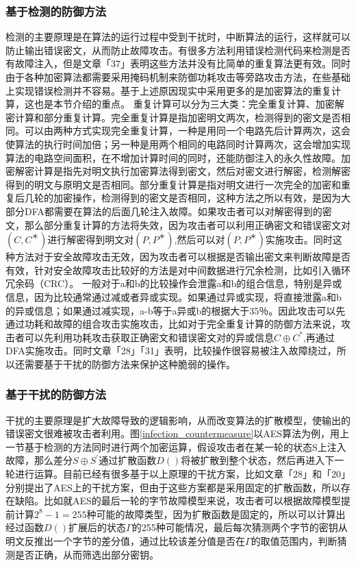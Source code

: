 \documentclass[a4paper,12pt]{article}
\begin{document}
\begin{CJK}{UTF8}{gkai}
\subsubsection{基于检测的防御方法}
检测的主要原理是在算法的运行过程中受到干扰时，中断算法的运行，这样就可以防止输出错误密文，从而防止故障攻击。有很多方法利用错误检测代码来检测是否有故障注入，但是文章「37」表明这些方法并没有比简单的重复算法更有效。同时由于各种加密算法都需要采用掩码机制来防御功耗攻击等旁路攻击方法，在些基础上实现错误检测并不容易。基于上述原因现实中采用更多的是加密算法的重复计算，这也是本节介绍的重点。
重复计算可以分为三大类：完全重复计算、加密解密计算和部分重复计算。完全重复计算是指加密明文两次，检测得到的密文是否相同。可以由两种方式实现完全重复计算，一种是用同一个电路先后计算两次，这会使算法的执行时间加倍；另一种是用两个相同的电路同时计算两次，这会增加实现算法的电路空间面积，在不增加计算时间的同时，还能防御注入的永久性故障。加密解密计算是指先对明文执行加密算法得到密文，然后对密文进行解密，检测解密得到的明文与原明文是否相同。部分重复计算是指对明文进行一次完全的加密和重复后几轮的加密操作，检测得到的密文是否相同，这种方法之所以有效，是因为大部分DFA都需要在算法的后面几轮注入故障。如果攻击者可以对解密得到的密文，那么部分重复计算的方法将失效，因为攻击者可以利用正确密文和错误密文对$(C,C^＊)$进行解密得到明文对$(P,P^＊)$,然后可以对$(P,P^＊)$实施攻击。同时这种方法对于安全故障攻击无效，因为攻击者可以根据是否输出密文来判断故障是否有效，针对安全故障攻击比较好的方法是对中间数据进行冗余检测，比如引入循环冗余码（CRC）。
一般对于a和b的比较操作会泄露a和b的组合信息，特别是异或信息，因为比较通常通过减或者异或实现。如果通过异或实现，将直接泄露a和b的异或信息；如果通过减实现，a-b等于a异或b的根据大于35％。因此攻击可以先通过功耗和故障的组合攻击实施攻击，比如对于完全重复计算的防御方法来说，攻击者可以先利用功耗攻击获取正确密文和错误密文对的异或信息$C \oplus C^*$,再通过DFA实施攻击。同时文章「28」「31」表明，比较操作很容易被注入故障绕过，所以还需要基于干扰的防御方法来保护这种脆弱的操作。

\subsubsection{基于干扰的防御方法}
干扰的主要原理是扩大故障导致的逻辑影响，从而改变算法的扩散模型，使输出的错误密文很难被攻击者利用。图\ref{infection_countermeasure}以AES算法为例，用上一节基于检测的方法同时进行两个加密运算，假设攻击者在某一轮的状态S上注入故障，那么差分$S \oplus S^'$通过扩散函数$D()$将被扩散到整个状态，然后再进入下一轮进行运算。目前已经有很多基于以上原理的干扰方案，比如文章「28」和「20」分别提出了AES上的干扰方案，但由于这些方案都是采用固定的扩散函数，所以存在缺陷。比如就AES的最后一轮的字节故障模型来说，攻击者可以根据故障模型提前计算$2^8-1=255$种可能的故障类型，因为扩散函数是固定的，所以可以计算出经过函数$D()$扩展后的状态$\Gamma$的255种可能情况，最后每次猜测两个字节的密钥从明文反推出一个字节的差分值，通过比较该差分值是否在$\Gamma$的取值范围内，判断猜测是否正确，从而筛选出部分密钥。


\end{CJK}
\end{document}
